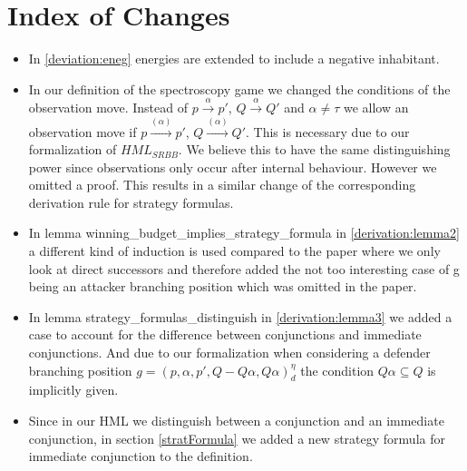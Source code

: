 \section{Index of Changes}
\begin{itemize}
    \item In \ref{deviation:eneg} energies are extended to include a negative inhabitant. 
    \item In our definition of the spectroscopy game we changed the conditions of the observation move. 
    Instead of $p \overset{\alpha}{\longrightarrow}p'$, $Q \overset{\alpha}{\longrightarrow} Q'$ and $\alpha \neq \tau$
    we allow an observation move if  $p \overset{(\alpha)}{\longrightarrow}p'$, $Q \overset{(\alpha)}{\longrightarrow} Q'$.
    This is necessary due to our formalization of $HML_{SRBB}$. We believe this to have the same distinguishing power 
    since observations only occur after internal behaviour. However we omitted a proof. 
    This results in a similar change of the corresponding derivation rule for strategy formulas.
    \item In lemma winning\_budget\_implies\_strategy\_formula in \ref{derivation:lemma2} a different kind of induction is used compared to the paper 
    where we only look at direct successors and therefore added the not too interesting case of g being an 
    attacker branching position which was omitted in the paper.
   \item In lemma strategy\_formulas\_distinguish in  \ref{derivation:lemma3} we added a case to account for the difference between 
conjunctions and immediate conjunctions. And due to our formalization when considering a
defender branching position $g=(p,\alpha ,p', Q - Q\alpha, Q\alpha)_d^\eta$ the condition 
$Q \alpha \subseteq Q$ is implicitly given.
  \item Since in our HML we distinguish between a conjunction and an immediate conjunction, in section \ref{stratFormula} 
we added a new strategy formula for immediate conjunction to the definition.
\end{itemize}

